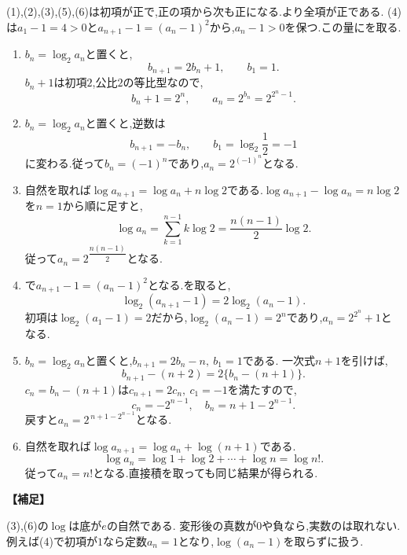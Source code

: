   (1),(2),(3),(5),(6)は初項が正で,正の項から次も正になる.より全項が正である.
  (4)は$a_1-1=4>0$と$a_{n+1}-1=(a_n-1)^2$から,$a_n-1>0$を保つ.この量にを取る.
  \begin{enumerate}[label=(\arabic*),parsep=3pt,format=\bookitemlink{example-logarithmic-1}{solution}{problem}]
    \item $b_n=\log_2a_n$と置くと,
          \[
            b_{n+1}=2b_n+1,\qquad b_1=1.
          \]
          $b_n+1$は初項$2$,公比$2$の等比型なので,
          \[
            b_n+1=2^n,\qquad a_n=2^{b_n}=2^{2^n-1}.
          \]
    \item $b_n=\log_2a_n$と置くと,逆数は
          \[
            b_{n+1}=-b_n,\qquad b_1=\log_2\frac12=-1
          \]
          に変わる.従って$b_n=(-1)^n$であり,$a_n=2^{(-1)^n}$となる.
    \item 自然を取れば$\log a_{n+1}=\log a_n+n\log2$である.$\log a_{n+1}-\log a_n=n\log2$を$n=1$から順に足すと,
          \[
            \log a_n=\sum_{k=1}^{n-1}k\log2=\frac{n(n-1)}2\log2.
          \]
          従って$a_n=2^{\dfrac{n(n-1)}{2}}$となる.
    \item {}で$a_{n+1}-1=(a_n-1)^2$となる.を取ると,
          \[
            \log_2(a_{n+1}-1)=2\log_2(a_n-1).
          \]
          初項は$\log_2(a_1-1)=2$だから,$\log_2(a_n-1)=2^n$であり,$a_n=2^{2^n}+1$となる.
    \item $b_n=\log_2a_n$と置くと,$b_{n+1}=2b_n-n,\ b_1=1$である.
          一次式$n+1$を引けば,
          \[
            b_{n+1}-(n+2)=2\{b_n-(n+1)\}.
          \]
          $c_n=b_n-(n+1)$は$c_{n+1}=2c_n,\ c_1=-1$を満たすので,
          \[
            c_n=-2^{n-1},\quad b_n=n+1-2^{n-1}.
          \]
          戻すと$a_n=2^{\,n+1-2^{n-1}}$となる.
    \item 自然を取れば$\log a_{n+1}=\log a_n+\log(n+1)$である.
          \[
            \log a_n=\log1+\log2+\cdots+\log n=\log n!.
          \]
          従って$a_n=n!$となる.直接積を取っても同じ結果が得られる.
  \end{enumerate}
  \noindent\textbf{【補足】}

  (3),(6)の$\log$は底が$e$の自然である.
  変形後の真数が$0$や負なら,実数のは取れない.例えば(4)で初項が$1$なら定数$a_n=1$となり,$\log(a_n-1)$を取らずに扱う.

